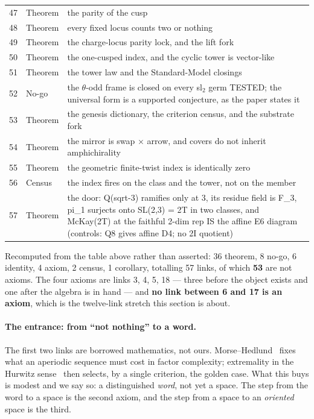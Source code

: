 \documentclass[11pt,a4paper]{article}
\theoremstyle{definition}
\theoremstyle{remark}
\begin{document}
\begin{longtable}{@{}r l p{8.2cm}@{}}
47 & Theorem & the parity of the cusp \\
48 & Theorem & every fixed locus counts two or nothing \\
49 & Theorem & the charge-locus parity lock, and the lift fork \\
50 & Theorem & the one-cusped index, and the cyclic tower is vector-like \\
51 & Theorem & the tower law and the Standard-Model closings \\
52 & No-go & the $\theta$-odd frame is closed on every sl$_2$ germ TESTED; the universal form is a supported conjecture, as the paper states it \\
53 & Theorem & the genesis dictionary, the criterion census, and the substrate fork \\
54 & Theorem & the mirror is swap $\times$ arrow, and covers do not inherit amphichirality \\
55 & Theorem & the geometric finite-twist index is identically zero \\
56 & Census & the index fires on the class and the tower, not on the member \\
57 & Theorem & the door: Q(sqrt-3) ramifies only at 3, its residue field is F\_3, pi\_1 surjects onto SL(2,3) = 2T in two classes, and McKay(2T) at the faithful 2-dim rep IS the affine E6 diagram (controls: Q8 gives affine D4; no 2I quotient) \\
\end{longtable}\endgroup

\noindent\footnotesize Recomputed from the table above rather than asserted:
36 theorem, 8 no-go, 6 identity, 4 axiom, 2 census, 1 corollary, totalling 57 links, of which \textbf{53} are not axioms. The four axioms are
links 3, 4, 5, 18 --- three before the object exists and one after the
algebra is in hand --- and \textbf{no link between 6 and 17 is an
axiom}, which is the twelve-link stretch this section is about.\normalsize

\paragraph{The entrance: from ``not nothing'' to a word.} The first two links are borrowed
mathematics, not ours. Morse--Hedlund~\cite{morsehedlund} fixes what an aperiodic sequence must cost in
factor complexity; extremality in the Hurwitz sense~\cite{hurwitz} then selects, by a single criterion, the golden case.
What this buys is modest and we say so: a distinguished \emph{word}, not yet a space. The step from
the word to a space is the second axiom, and the step from a space to an \emph{oriented} space is
the third.
\end{document}
